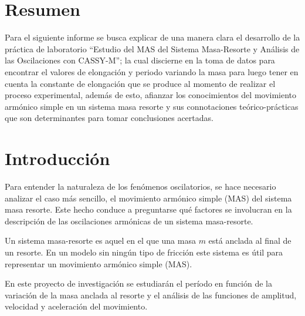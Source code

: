 \documentclass[spanish,notitlepage,letterpaper, 12pt]{article}
\begin{document}

\tableofcontents

\newpage

\section{Resumen}
Para el siguiente informe se busca explicar de una manera clara el desarrollo de la práctica de laboratorio “Estudio del MAS del Sistema Masa-Resorte y Análisis de las Oscilaciones con CASSY-M”; la cual discierne en la toma de datos para encontrar el valores de elongación y periodo variando la masa para luego tener en cuenta la constante de elongación que se produce al momento de realizar el proceso experimental, además de esto, afianzar los conocimientos del movimiento armónico simple en un sistema masa resorte y sus connotaciones teórico-prácticas que son determinantes para tomar conclusiones acertadas. 

\section{Introducción}
Para entender la naturaleza de los fenómenos oscilatorios, se hace necesario analizar el caso más sencillo, el movimiento armónico simple (MAS) del sistema masa resorte. Este hecho conduce a preguntarse qué factores se involucran en la descripción de las oscilaciones armónicas de un sistema masa-resorte. 

Un sistema masa-resorte es aquel en el que una masa $m$ está anclada al final de un resorte. En un modelo sin ningún tipo de fricción este sistema es útil para representar un movimiento armónico simple (MAS). \cite{serway_jewett_2017}\par
\bigskip
En este proyecto de investigación se estudiarán el período en función de la variación de la masa anclada al resorte y el análisis de las funciones de amplitud, velocidad y aceleración del movimiento.
\end{document}
